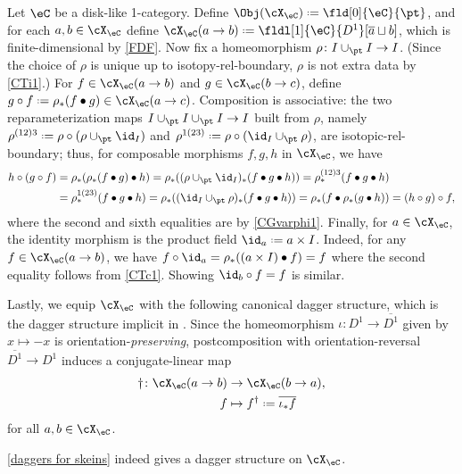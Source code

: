 \documentclass[12pt,reqno]{amsart}
\newcommand{\C}{\eC}
\newcommand{\blt}{\bullet}
\newcommand{\fcj}[1]{\overline{#1}}
\newcommand{\orev}{\overline}
\renewcommand{\amalg}{\sqcup}
\renewcommand{\star}{\dag}
\DeclareRobustCommand{\coloneq}{\mathrel{\vcenter{\baselineskip0.5ex\lineskiplimit0pt\hbox{\scriptsize{\upshape.}}\hbox{\scriptsize{\upshape.}}}}=}
\begin{document}
\begin{construction}
  \label{skein 1-categories}
  \label{daggers for skeins}
  Let $\C$ be a disk-like 1-category. Define $\Obj(\cX_\C)\coloneq\fld[0]{\C}{\pt}$, and for each $a,b\in\cX_\C$ define $\cX_\C(a \to b) \coloneq \fldl[1]{\C}{D^1}[ \fcj{a} \amalg b]$, which is finite-dimensional by \ref{FDF}.
  Now fix a homeomorphism $\rho\colon I\cup_\pt I\to I$. (Since the choice of $\rho$ is unique up to isotopy-rel-boundary, $\rho$ is not extra data by \ref{CTi1}.) For $f \in \cX_\C(a \to b)$ and $g \in \cX_\C(b \to c)$, define $g \circ f \coloneq \rho_*(f \blt g)\in\cX_\C(a\to c)$. Composition is associative: the two reparameterization maps $I\cup_\pt I\cup_\pt I\to I$ built from $\rho$, namely $\rho^{(12)3}\coloneq \rho\circ(\rho\cup_\pt\id_I)$ and $\rho^{1(23)}\coloneq \rho\circ(\id_I\cup_\pt\rho)$, are isotopic-rel-boundary; thus, for composable morphisms $f,g,h$ in $\cX_\C$, we have
  \begin{align*}
    h\circ (g\circ f)
     & =
    \rho_*(\rho_*(f\blt g)\blt h)
    =
    \rho_*((\rho\cup_\pt\id_I)_*(f\blt g\blt h))
    =
    \rho^{(12)3}_*(f\blt g\blt h)
    \\&
    =
    \rho^{1(23)}_*(f\blt g\blt h)
    =
    \rho_*((\id_I\cup_\pt\rho)_*(f\blt g\blt h))
    =
    \rho_*(f\blt \rho_*(g\blt h))
    =
    (h\circ g)\circ f,
  \end{align*}
  where the second and sixth equalities are by \ref{CGvarphi1}. Finally, for $a\in\cX_\C$, the identity morphism is the product field $\id_a\coloneq a \times I$. Indeed, for any $f\in\cX_\C(a\to b)$, we have $f \circ \id_a=\rho_*((a\times I) \blt f)=f$ where the second equality follows from \ref{CTc1}. Showing $\id_b \circ f = f$ is similar.

  Lastly, we equip $\cX_\C$ with the following canonical dagger structure, which is the dagger structure implicit in \cite[Ch. 4]{W06}. Since the homeomorphism $\iota\colon D^1\to \orev{D^1}$ given by $x\mapsto -x$ is orientation-\emph{preserving}, postcomposition with orientation-reversal $\orev{D^1}\to D^1$ induces a conjugate-linear map
  \[
    \begin{aligned}
      \star\colon\cX_\C(a\to b) & \to \cX_\C(b\to a),                \\
      f                        & \mapsto f^\dag\coloneq \fcj{\iota_*f}
    \end{aligned}
  \]
  for all $a,b\in\cX_\C$.
\end{construction}

\begin{lemma}
  \cref{daggers for skeins} indeed gives a dagger structure on $\cX_\C$.
\end{lemma}
\end{document}
